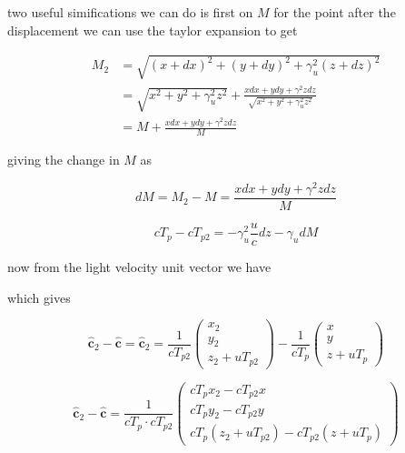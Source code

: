 two useful simifications we can do is first on $M$ for the point after the displacement we can use the taylor expansion to get

\begin{equation}
	\begin{aligned}
		M_2 &= \sqrt{(x+dx)^2 + (y+dy)^2 + \gamma_u^2 (z+dz)^2} \\
		&= \sqrt{x^2 + y^2 + \gamma_u^2 z^2} + \frac{xdx + ydy + \gamma^2 zdz}{\sqrt{x^2 + y^2 + \gamma_u^2 z^2}} \\
		&= M + \frac{xdx + ydy + \gamma^2 zdz}{M}
	\end{aligned}
\end{equation}

giving the change in $M$ as

\begin{equation}
	dM = M_2 - M = \frac{xdx + ydy + \gamma^2 zdz}{M}
\end{equation}

\begin{equation}
		cT_{p} - cT_{p2} = - \gamma_u^2 \frac{u}{c} dz - \gamma_u dM
\end{equation}

now from the light velocity unit vector we have

which gives

\begin{equation}
	\mathbf{\hat{c}}_2 - \mathbf{\hat{c}} = \mathbf{\hat{c}}_2 = \frac{1}{c T_{p2}}
	\begin{pmatrix}
		x_2 \\
		y_2 \\
		z_2 + u T_{p2}
	\end{pmatrix} - \frac{1}{c T_{p}}
	\begin{pmatrix}
		x \\
		y \\
		z + u T_{p}
	\end{pmatrix}
\end{equation}

\begin{equation}
	\mathbf{\hat{c}}_2 - \mathbf{\hat{c}} = \frac{1}{c T_{p} \cdot c T_{p2}}
	\begin{pmatrix}
		c T_{p} x_2 - c T_{p2} x\\
		c T_{p} y_2 - c T_{p2} y\\
		c T_{p} (z_2 + u T_{p2}) - c T_{p2} (z + u T_{p})
	\end{pmatrix}
\end{equation}

